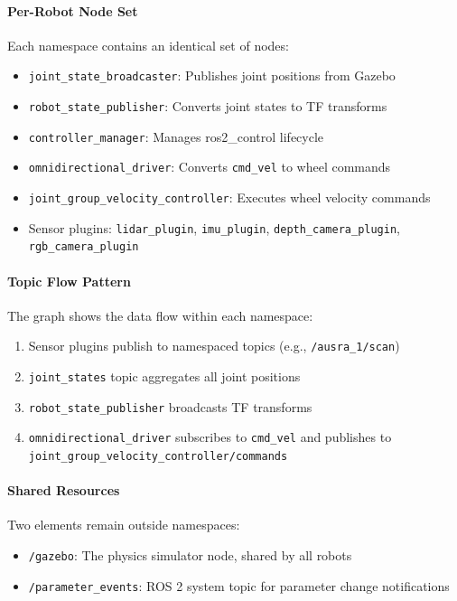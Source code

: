 \paragraph{Per-Robot Node Set}
Each namespace contains an identical set of nodes:
\begin{itemize}
    \item \texttt{joint\_state\_broadcaster}: Publishes joint positions from Gazebo
    \item \texttt{robot\_state\_publisher}: Converts joint states to TF transforms
    \item \texttt{controller\_manager}: Manages ros2\_control lifecycle
    \item \texttt{omnidirectional\_driver}: Converts \texttt{cmd\_vel} to wheel commands
    \item \texttt{joint\_group\_velocity\_controller}: Executes wheel velocity commands
    \item Sensor plugins: \texttt{lidar\_plugin}, \texttt{imu\_plugin}, \texttt{depth\_camera\_plugin}, \texttt{rgb\_camera\_plugin}
\end{itemize}

\paragraph{Topic Flow Pattern}
The graph shows the data flow within each namespace:
\begin{enumerate}
    \item Sensor plugins publish to namespaced topics (e.g., \texttt{/ausra\_1/scan})
    \item \texttt{joint\_states} topic aggregates all joint positions
    \item \texttt{robot\_state\_publisher} broadcasts TF transforms
    \item \texttt{omnidirectional\_driver} subscribes to \texttt{cmd\_vel} and publishes to \texttt{joint\_group\_velocity\_controller/commands}
\end{enumerate}

\paragraph{Shared Resources}
Two elements remain outside namespaces:
\begin{itemize}
    \item \texttt{/gazebo}: The physics simulator node, shared by all robots
    \item \texttt{/parameter\_events}: ROS 2 system topic for parameter change notifications
\end{itemize}

